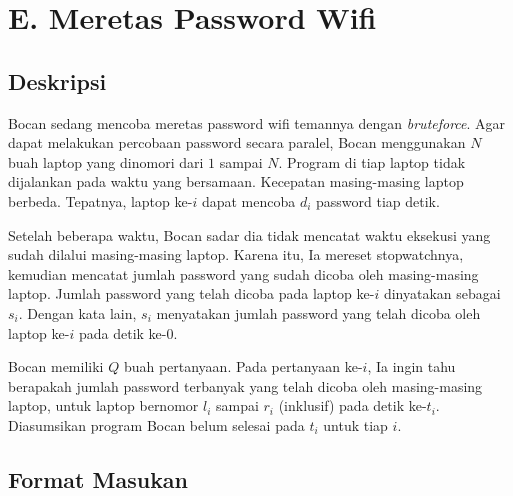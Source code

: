 \documentclass{article}
\begin{document}
\pagestyle{fancy}
\fancyhf{}
\renewcommand{\headrulewidth}{0pt}

\section*{\hfil E. Meretas Password Wifi\hfil}


\subsection*{Deskripsi}

\par\noindent Bocan sedang mencoba meretas password wifi temannya dengan \textit{bruteforce}. Agar dapat melakukan percobaan password secara paralel, Bocan menggunakan $N$ buah laptop yang dinomori dari $1$ sampai $N$. Program di tiap laptop tidak dijalankan pada waktu yang bersamaan. Kecepatan masing-masing laptop berbeda. Tepatnya, laptop ke-$i$ dapat mencoba $d_i$ password tiap detik.
\newline
\par\noindent Setelah beberapa waktu, Bocan sadar dia tidak mencatat waktu eksekusi yang sudah dilalui masing-masing laptop. Karena itu, Ia mereset stopwatchnya, kemudian mencatat jumlah password yang sudah dicoba oleh masing-masing laptop. Jumlah password yang telah dicoba pada laptop ke-$i$ dinyatakan sebagai $s_i$. Dengan kata lain, $s_i$ menyatakan jumlah password yang telah dicoba oleh laptop ke-$i$ pada detik ke-$0$. 
\newline
\par\noindent Bocan memiliki $Q$ buah pertanyaan. Pada pertanyaan ke-$i$, Ia ingin tahu berapakah jumlah password terbanyak yang telah dicoba oleh masing-masing laptop, untuk laptop bernomor $l_i$ sampai $r_i$ (inklusif) pada detik ke-$t_i$. Diasumsikan program Bocan belum selesai pada $t_i$ untuk tiap $i$.

\subsection*{Format Masukan}
\end{document}
